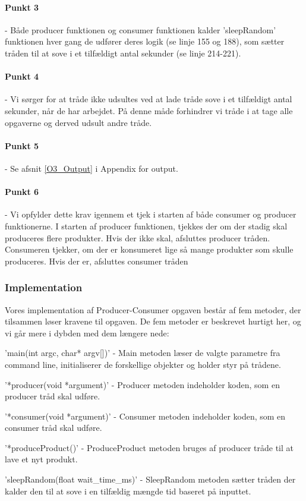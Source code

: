 \paragraph{Punkt 3} - Både producer funktionen og consumer funktionen kalder 'sleepRandom' funktionen hver gang de udfører deres logik (se linje 155 og 188), som sætter tråden til at sove i et tilfældigt antal sekunder (se linje 214-221).
\paragraph{Punkt 4} - Vi sørger for at tråde ikke udsultes ved at lade tråde sove i et tilfældigt antal sekunder, når de har arbejdet. På denne måde forhindrer vi tråde i at tage alle opgaverne og derved udsult andre tråde.
\paragraph{Punkt 5} - Se afsnit \ref{O3_Output} i Appendix for output.
\paragraph{Punkt 6} - Vi opfylder dette krav igennem et tjek i starten af både consumer og producer funktionerne. I starten af producer funktionen, tjekkes der om der stadig skal produceres flere produkter. Hvis der ikke skal, afsluttes producer tråden. Consumeren tjekker, om der er konsumeret lige så mange produkter som skulle produceres. Hvis der er, afsluttes consumer tråden

\subsubsection{Implementation}
\label{O3_Implementation}
Vores implementation af Producer-Consumer opgaven består af fem metoder, der tilsammen løser kravene til opgaven. De fem metoder er beskrevet hurtigt her, og vi går mere i dybden med dem længere nede: 
\begin{my_enumerate}
    \item 'main(int argc, char* argv[])' - Main metoden læser de valgte parametre fra command line, initialiserer de forskellige objekter og holder styr på trådene.
    \item '*producer(void *argument)' - Producer metoden indeholder koden, som en producer tråd skal udføre. 
    \item '*consumer(void *argument)' - Consumer metoden indeholder koden, som en consumer tråd skal udføre. 
    \item '*produceProduct()' - ProduceProduct metoden bruges af producer tråde til at lave et nyt produkt.
    \item 'sleepRandom(float wait_time_ms)' - SleepRandom metoden sætter tråden der kalder den til at sove i en tilfældig mængde tid baseret på inputtet.
\end{my_enumerate}

